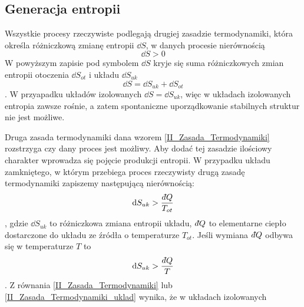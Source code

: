 \documentclass[10pt, a4paper, twoside, onecolumn]{article}
\numberwithin{equation}{section}
\newcommand{\dbar}{d\hspace*{-0.08em}\bar{}\hspace*{0.1em}}
\begin{document}
	\subsection{Generacja entropii}
	Wszystkie procesy rzeczywiste podlegają drugiej zasadzie termodynamiki, która określa różniczkową zmianę entropii \(\dd{S}\), w danych procesie nierównością
	\begin{equation}\label{II_Zasada_Termodynamiki}
		\dd{S}>0
	\end{equation}
	W powyższym zapisie pod symbolem \(\dd{S}\) kryje się suma różniczkowych zmian entropii otoczenia \(\dd{S_{ot}}\) i układu \(\dd{S_{uk}}\)
	\begin{equation}
		\dd{S}=\dd{S_{uk}}+\dd{S_{ot}}
	\end{equation}.
	W przyapadku układów izolowanych \(\dd{S}=\dd{S_{uk}}\), 
	więc w układach izolowanych entropia zawsze rośnie, a zatem spontaniczne uporządkowanie stabilnych struktur nie jest możliwe. \par
	Druga zasada termodynamiki dana wzorem \eqref{II_Zasada_Termodynamiki} rozstrzyga czy dany proces jest możliwy. Aby dodać tej zasadzie ilościowy charakter wprowadza się pojęcie produkcji entropii. W przypadku układu zamkniętego, w którym przebiega proces rzeczywisty drugą zasadę termodynamiki zapiszemy następującą nierównością: 
	\begin{equation}\label{II_Zasada_Termodynamiki_uklad}
		\dd{S_{uk}}>\frac{\dbar Q}{T_{ot}}
	\end{equation},
	gdzie \(\dd{S_{uk}}\) to różniczkowa zmiana entropii układu, \(\dbar Q\) to elementarne ciepło dostarczone do układu ze źródła o temperaturze \(T_{ot}\). Jeśli wymiana \(\dbar Q\) odbywa się w temperaturze \(T\) to 
	\begin{equation}
		\dd{S_{uk}}>\frac{\dbar Q}{T}
	\end{equation}.
	Z równania \eqref{II_Zasada_Termodynamiki} lub \eqref{II_Zasada_Termodynamiki_uklad} wynika, że w układach izolowanych %
	
\end{document}
